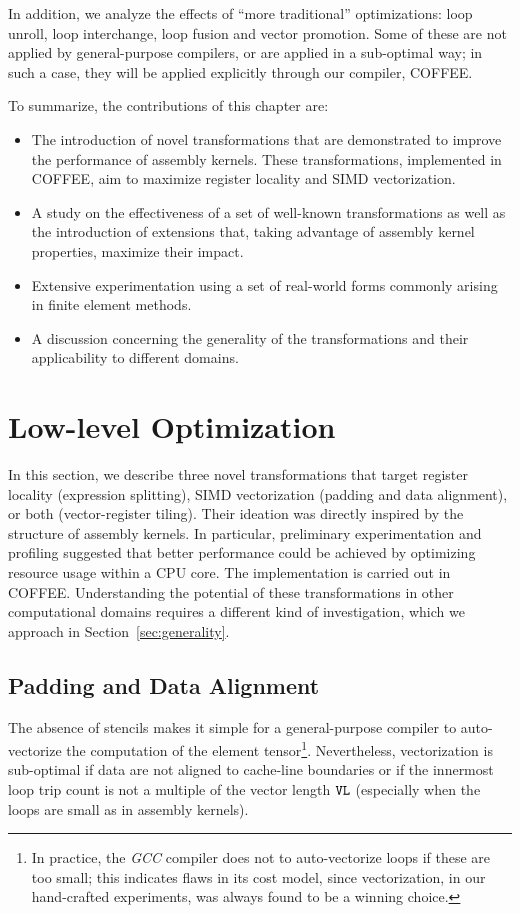 In addition, we analyze the effects of ``more traditional'' optimizations: loop unroll, loop interchange, loop fusion and vector promotion. Some of these are not applied by general-purpose compilers, or are applied in a sub-optimal way; in such a case, they will be applied explicitly through our compiler, COFFEE. 

To summarize, the contributions of this chapter are:
\begin{itemize}
\item The introduction of novel transformations that are demonstrated to improve the performance of assembly kernels. These transformations, implemented in COFFEE, aim to maximize register locality and SIMD vectorization.
\item A study on the effectiveness of a set of well-known transformations as well as the introduction of extensions that, taking advantage of assembly kernel properties, maximize their impact.
\item Extensive experimentation using a set of real-world forms commonly arising in finite element methods.
\item A discussion concerning the generality of the transformations and their applicability to different domains.
\end{itemize}

\section{Low-level Optimization}
\label{sec:lowlevelopt}

In this section, we describe three novel transformations that target register locality (expression splitting), SIMD vectorization (padding and data alignment), or both (vector-register tiling). Their ideation was directly inspired by the structure of assembly kernels. In particular, preliminary experimentation and profiling suggested that better performance could be achieved by optimizing resource usage within a CPU core. The implementation is carried out in COFFEE. Understanding the potential of these transformations in other computational domains requires a different kind of investigation, which we approach in Section~\ref{sec:generality}. 

\subsection{Padding and Data Alignment}
\label{sec:coffee-padding}
The absence of stencils makes it simple for a general-purpose compiler to auto-vectorize the computation of the element tensor\footnote{In practice, the {\em GCC} compiler does not to auto-vectorize loops if these are too small; this indicates flaws in its cost model, since vectorization, in our hand-crafted experiments, was always found to be a winning choice.}. Nevertheless, vectorization is sub-optimal if data are not aligned to cache-line boundaries or if the innermost loop trip count is not a multiple of the vector length $\mbox{\texttt{VL}}$ (especially when the loops are small as in assembly kernels). 


